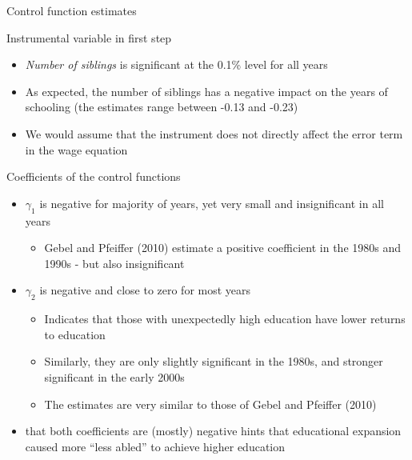 \documentclass[10pt,ignorenonframetext,]{beamer}
\providecommand{\tightlist}{%
  \setlength{\itemsep}{0pt}\setlength{\parskip}{0pt}}
\begin{document}
\begin{frame}[allowframebreaks]{Control function estimates}
\protect\hypertarget{control-function-estimates}{}

Instrumental variable in first step

\begin{itemize}
\tightlist
\item
  \emph{Number of siblings} is significant at the 0.1\% level for all
  years
\item
  As expected, the number of siblings has a negative impact on the years
  of schooling (the estimates range between -0.13 and -0.23)
\item
  We would assume that the instrument does not directly affect the error
  term in the wage equation
\end{itemize}

Coefficients of the control functions

\begin{itemize}
\tightlist
\item
  \(\gamma_1\) is negative for majority of years, yet very small and
  insignificant in all years

  \begin{itemize}
  \tightlist
  \item
    Gebel and Pfeiffer (2010) estimate a positive coefficient in the
    1980s and 1990s - but also insignificant
  \end{itemize}
\item
  \(\gamma_2\) is negative and close to zero for most years

  \begin{itemize}
  \tightlist
  \item
    Indicates that those with unexpectedly high education have lower
    returns to education
  \item
    Similarly, they are only slightly significant in the 1980s, and
    stronger significant in the early 2000s
  \item
    The estimates are very similar to those of Gebel and Pfeiffer (2010)
  \end{itemize}
\item
  that both coefficients are (mostly) negative hints that educational
  expansion caused more ``less abled'' to achieve higher education
\end{itemize}

\end{frame}
\end{document}
